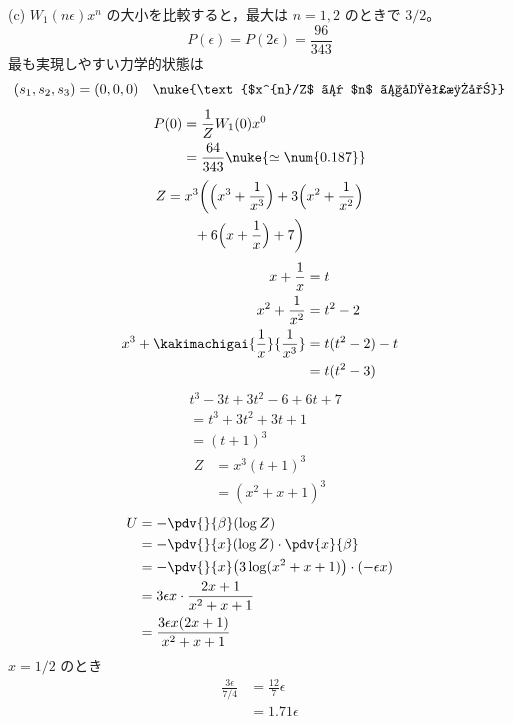 (c) $W_{1}(n\epsilon)x^{n}$ の大小を比較すると，最大は $n=1,2$ のときで $3/2$。
\[ P(\epsilon)=P(2\epsilon)=\frac{96}{343} \]
最も実現しやすい力学的状態は
\[ (s_{1},s_{2},s_{3})=(0,0,0)\quad\nuke{\text{$x^{n}/Z$ は $n$ で単調減少}} \]
\begin{align*}
P(0)&=\frac{1}{Z}W_{1}(0)x^{0}\\
&=\frac{64}{343}\nuke{\simeq\num{0.187}}
\end{align*}
\begin{align*}
Z&=x^{3}\biggl(\Bigl(x^{3}+\frac{1}{x^{3}}\Bigr)+3\Bigl(x^{2}+\frac{1}{x^{2}}\Bigr)\\
&\qquad+6\Bigl(x+\frac{1}{x}\Bigr)+7\biggr)
\end{align*}
\begin{align*}
x+\frac{1}{x}&=t\\
x^{2}+\frac{1}{x^{2}}&=t^{2}-2\\
x^{3}+\kakimachigai{\frac{1}{x}}{\frac{1}{x^{3}}}&=t(t^{2}-2)-t\\
&=t(t^{2}-3)
\end{align*}
\begin{align*}
&t^{3}-3t+3t^{2}-6+6t+7\\
&=t^{3}+3t^{2}+3t+1\\
&=(t+1)^{3}
\end{align*}
\begin{align*}
Z&=x^{3}(t+1)^{3}\\
&=(x^{2}+x+1)^{3}
\end{align*}
\begin{align*}
U&=-\pdv{}{\beta}(\log Z)\\
&=-\pdv{}{x}(\log Z)\cdot\pdv{x}{\beta}\\
&=-\pdv{}{x}\bigl(3\log(x^{2}+x+1)\bigr)\cdot(-\epsilon x)\\
&=3\epsilon x\cdot\frac{2x+1}{x^{2}+x+1}\\
&=\frac{3\epsilon x(2x+1)}{x^{2}+x+1}
\end{align*}
$x=1/2$ のとき
\begin{align*}
\frac{3\epsilon}{7/4}&=\frac{12}{7}\epsilon\\
&=1.71\epsilon
\end{align*}
